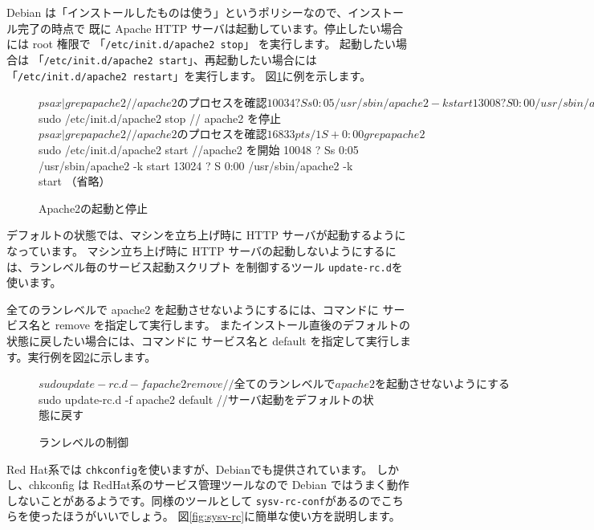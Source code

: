 \documentclass[mingoth,a4paper]{jsarticle}
\begin{document}
Debian は「インストールしたものは使う」というポリシーなので、インストール完了の時点で
既に Apache HTTP サーバは起動しています。停止したい場合には root 権限で
「\texttt{/etc/init.d/apache2 stop}」 を実行します。
起動したい場合は 「\texttt{/etc/init.d/apache2 start}」、再起動したい場合には
「\texttt{/etc/init.d/apache2 restart}」を実行します。
図\ref{fig:startstop}に例を示します。

\begin{figure}[ht]

\begin{commandline}
$ ps ax | grep apache2 // apache2 のプロセスを確認
10034 ?        Ss     0:05 /usr/sbin/apache2 -k start
13008 ?        S      0:00 /usr/sbin/apache2 -k start
（省略）
$ sudo /etc/init.d/apache2 stop // apache2 を停止
$ ps ax | grep apache2 // apache2 のプロセスを確認
16833 pts/1    S+     0:00 grep apache2
$ sudo /etc/init.d/apache2 start //apache2 を開始
10048 ?        Ss     0:05 /usr/sbin/apache2 -k start
13024 ?        S      0:00 /usr/sbin/apache2 -k start
（省略）
\end{commandline}

\label{fig:startstop}\caption{Apache2の起動と停止}
\end{figure}

デフォルトの状態では、マシンを立ち上げ時に HTTP サーバが起動するようになっています。
マシン立ち上げ時に HTTP サーバの起動しないようにするには、ランレベル毎のサービス起動スクリプト
を制御するツール \texttt{update-rc.d}を使います。

全てのランレベルで apache2 を起動させないようにするには、コマンドに
サービス名と remove を指定して実行します。
またインストール直後のデフォルトの状態に戻したい場合には、コマンドに
サービス名と default を指定して実行します。実行例を図\ref{fig:update-rc}に示します。

\begin{figure}[ht]
\begin{commandline}
$ sudo update-rc.d -f apache2 remove // 全てのランレベルで apache2 を起動させないようにする
$ sudo update-rc.d -f apache2 default //サーバ起動をデフォルトの状態に戻す
\end{commandline}
\label{fig:update-rc}\caption{ランレベルの制御}
\end{figure}

Red Hat系では \texttt{chkconfig}を使いますが、Debianでも提供されています。
しかし、chkconfig は RedHat系のサービス管理ツールなので Debian
ではうまく動作しないことがあるようです。同様のツールとして
\texttt{sysv-rc-conf}があるのでこちらを使ったほうがいいでしょう。
図\ref{fig:sysv-rc}に簡単な使い方を説明します。
\end{document}
